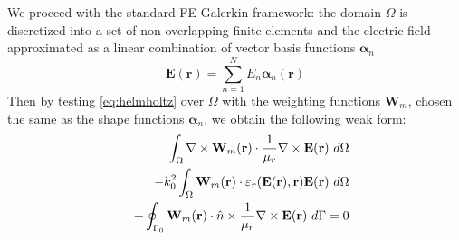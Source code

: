 \documentclass[journal]{IEEEtran}
\renewcommand{\vec}[1]{\mathbf{#1}}
\begin{document}
\par We proceed with the standard FE Galerkin framework: the domain $\Omega$ is discretized into a set of non overlapping finite elements and the electric field approximated as a linear combination of vector basis functions $\boldsymbol{\alpha}_n$ 
\begin{equation}
\vec{E}(\vec{r})  = \sum_{n=1}^N E_n \boldsymbol{\alpha}_n(\vec{r})
\end{equation} %
Then by testing \eqref{eq:helmholtz} over $\Omega$ with the weighting functions $\vec{W}_m$, chosen the same as the shape functions $\boldsymbol{\alpha}_n$, we obtain the following weak form:
\begin{eqnarray}\label{eq:fem}
& & \hspace{-1.5cm} \int_\Omega \nabla \times \vec{W}_m (\vec{r}) \cdot \frac{1}{\mu_r} \nabla \times \vec{E}(\vec{r}) \ d\Omega \nonumber \\
& & \hspace{-.75cm} - k_0^2 \int_\Omega  \vec{W}_m (\vec{r}) \cdot \varepsilon_r (\vec{E}(\vec{r}), \vec{r}) \vec{E}(\vec{r}) \ d\Omega \nonumber \\
& & + \oint_{\Gamma_0} \vec{W}_m (\vec{r}) \cdot \hat{n} \times \frac{1}{\mu_r} \nabla \times \vec{E}(\vec{r}) \ d\Gamma = 0
\end{eqnarray} 

\end{document}
